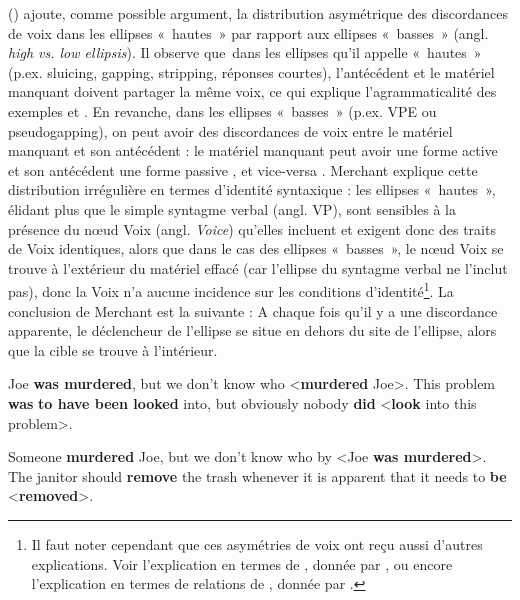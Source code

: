 \citeauthor{Merchant2008a} (\citeyear*{Merchant2008a,Merchant2009}) ajoute, comme possible argument, la distribution asy\-métrique des discordances de voix dans les ellipses «~hautes~» par rapport aux ellipses «~basses~» (angl. \textit{high vs. low ellipsis}). Il observe que~dans les ellipses qu’il appelle «~hautes~» (p.ex. sluicing, gapping, stripping, réponses courtes), l’antécédent et le matériel manquant doivent partager la même voix, ce qui explique l’agrammaticalité des exemples  et . En revanche, dans les ellipses «~basses~» (p.ex. VPE ou pseudogapping), on peut avoir des discordances de voix entre le matériel manquant et son antécédent : le matériel manquant peut avoir une forme active et son antécédent une forme passive , et vice-versa . Merchant explique cette distribution irrégulière en termes d’identité syntaxique : les ellipses «~hautes~», élidant plus que le simple syntagme verbal (angl. VP), sont sensibles à la présence du nœud Voix (angl. \textit{Voice}) qu’elles incluent et exigent donc des traits de Voix identiques, alors que dans le cas des ellipses «~basses~», le nœud Voix se trouve à l’extérieur du matériel effacé (car l’ellipse du syntagme verbal ne l’inclut pas), donc la Voix n’a aucune incidence sur les conditions d’identité\footnote{Il faut noter cependant que ces asymétries de voix ont reçu aussi d’autres explications. Voir l’explication en termes de , donnée par \citet{FrazierEtAl2005,FrazierEtAl2006}, ou encore l’explication en termes de relations de , donnée par \citet{Kehler2000,Kehler2002}.}. La conclusion de Merchant est la suivante : A chaque fois qu’il y a une discordance apparente, le déclencheur de l’ellipse se situe en dehors du site de l’ellipse, alors que la cible se trouve à l’intérieur.

\ea
\ea  *Joe \textbf{was murdered}, but we don’t know who {\textless}\textbf{murdered} Joe{\textgreater}. \label{ch1:ex152a}
\ex  This problem \textbf{was} \textbf{to have been looked} into, but obviously nobody \textbf{did} {\textless}\textbf{look} into this problem{\textgreater}. \label{ch1:ex152b}
\z
\z

\ea
\ea  *Someone \textbf{murdered} Joe, but we don’t know who by {\textless}Joe \textbf{was murdered}{\textgreater}. \label{ch1:ex153a}
\ex  The janitor should \textbf{remove} the trash whenever it is apparent that it needs to \textbf{be} {\textless}\textbf{removed}{\textgreater}. \label{ch1:ex153b}
\z
\z

